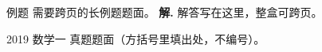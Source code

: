 \documentclass[a4paper,12pt,oneside,fontset=none]{ctexbook}
\newcommand{\R}{\mathbb{R}}
\newcommand{\sep}{\text{ · \ }}
\newcommand{\fillin}[1][3cm]{\,\underline{\hspace{#1}}\,}
\newcommand{\selectbracket}{\unskip\nolinebreak\quad \raisebox{0.7pt}[0pt][0pt]{\mbox{$(\qquad)$}}\par}
\newcounter{theorem}[chapter]
\newcounter{definition}[chapter]
\newcounter{example}[chapter]
\newenvironment{longexample}[1][]{\begin{longexBox}{例题}{#1}}{\end{longexBox}}
\newenvironment{realexam}[1][]
{%
\begin{realexamBox}{#1}}{\end{realexamBox}
}
\numberwithin{equation}{chapter}
\begin{document}
\begin{longexample}
需要跨页的长例题题面。
\tcblower
\textbf{解.} 解答写在这里，整盒可跨页。
\end{longexample}

\begin{realexam}[2019 数学一]
真题题面（方括号里填出处，不编号）。
\end{realexam}

%
%
%
\end{document}
